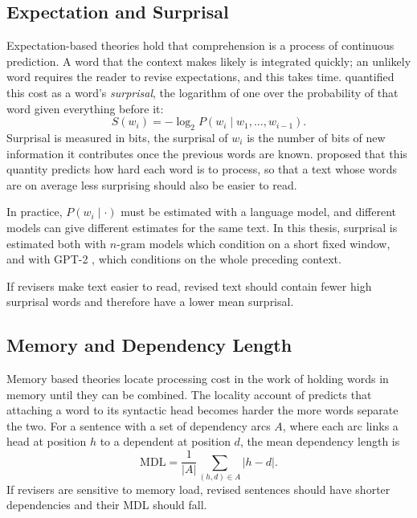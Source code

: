 \documentclass[12pt,a4paper,oneside]{report}
\begin{document}
\subsection{Expectation and Surprisal}
Expectation-based theories hold that comprehension is a process of continuous prediction. A word that the context makes likely is integrated quickly; an unlikely word requires the reader to revise expectations, and this takes time. \citet{hale2001} quantified this cost as a word's \emph{surprisal}, the logarithm of one over the probability of that word given everything before it:
\begin{equation}
  S(w_i) = -\log_2 P(w_i \mid w_1, \ldots, w_{i-1}).
  \label{eq:surprisal}
\end{equation}
Surprisal is measured in bits, the surprisal of $w_i$ is the number of bits of new information it contributes once the previous words are known. \citet{hale2001} proposed that this quantity predicts how hard each word is to process, so that a text whose words are on average less surprising should also be easier to read.

In practice, $P(w_i \mid \cdot)$ must be estimated with a language model, and different models can give different estimates for the same text. In this thesis, surprisal is estimated both with $n$-gram models which condition on a short fixed window, and with GPT-2 \citep{radford2019}, which conditions on the whole preceding context.

If revisers make text easier to read, revised text should contain fewer high surprisal words and therefore have a lower mean surprisal.

\subsection{Memory and Dependency Length}
Memory based theories locate processing cost in the work of holding words in memory until they can be combined. The locality account of \citet{gibson1998} predicts that attaching a word to its syntactic head becomes harder the more words separate the two. For a sentence with a set of dependency arcs $A$, where each arc links a head at position $h$ to a dependent at position $d$, the mean dependency length is
\begin{equation}
  \mathrm{MDL} = \frac{1}{|A|} \sum_{(h,d) \in A} |h - d|.
  \label{eq:mdl}
\end{equation}
If revisers are sensitive to memory load, revised sentences should have shorter dependencies and their MDL should fall.
\end{document}
